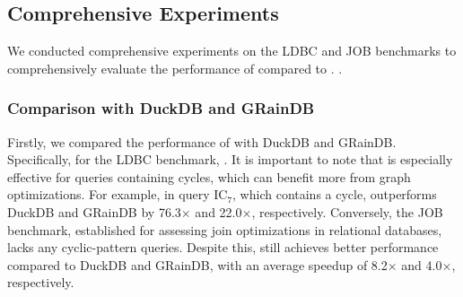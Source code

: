 \vspace{-1em}
\subsection{Comprehensive Experiments}
\label{sec:experiment-e2e}

We conducted comprehensive experiments on the LDBC and JOB benchmarks to comprehensively evaluate the performance of \name compared to .
.

\subsubsection{Comparison with DuckDB and GRainDB}

Firstly, we compared the performance of \name with DuckDB and GRainDB.
Specifically, for the LDBC benchmark, .
It is important to note that \name is especially effective for queries containing cycles, which can benefit more from graph optimizations. For example, in query $\text{IC}_{7}$, which contains a cycle, \name outperforms DuckDB and GRainDB by 76.3$\times$ and 22.0$\times$, respectively.
Conversely, the JOB benchmark, established for assessing join optimizations in relational databases, lacks any cyclic-pattern queries. Despite this, \name still achieves better performance compared to DuckDB and GRainDB, with an average speedup of 8.2$\times$ and 4.0$\times$, respectively.

